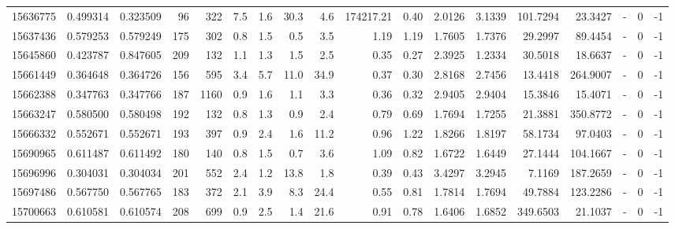 \begin{tabular}{rrrrrrrrrrrrrrrlrr}
  15636775 & 0.499314 &   0.323509 &   96 &  322 &      7.5 &      1.6 &    30.3 &      4.6 &  174217.21 &        0.40 &  2.0126 &  3.1339 &  101.7294 &   23.3427 &             - &        0 &         -1 \\
  15637436 & 0.579253 &   0.579249 &  175 &  302 &      0.8 &      1.5 &     0.5 &      3.5 &       1.19 &        1.19 &  1.7605 &  1.7376 &   29.2997 &   89.4454 &             - &        0 &         -1 \\
  15645860 & 0.423787 &   0.847605 &  209 &  132 &      1.1 &      1.3 &     1.5 &      2.5 &       0.35 &        0.27 &  2.3925 &  1.2334 &   30.5018 &   18.6637 &             - &        0 &         -1 \\
  15661449 & 0.364648 &   0.364726 &  156 &  595 &      3.4 &      5.7 &    11.0 &     34.9 &       0.37 &        0.30 &  2.8168 &  2.7456 &   13.4418 &  264.9007 &             - &        0 &         -1 \\
  15662388 & 0.347763 &   0.347766 &  187 & 1160 &      0.9 &      1.6 &     1.1 &      3.3 &       0.36 &        0.32 &  2.9405 &  2.9404 &   15.3846 &   15.4071 &             - &        0 &         -1 \\
  15663247 & 0.580500 &   0.580498 &  192 &  132 &      0.8 &      1.3 &     0.9 &      2.4 &       0.79 &        0.69 &  1.7694 &  1.7255 &   21.3881 &  350.8772 &             - &        0 &         -1 \\
  15666332 & 0.552671 &   0.552671 &  193 &  397 &      0.9 &      2.4 &     1.6 &     11.2 &       0.96 &        1.22 &  1.8266 &  1.8197 &   58.1734 &   97.0403 &             - &        0 &         -1 \\
  15690965 & 0.611487 &   0.611492 &  180 &  140 &      0.8 &      1.5 &     0.7 &      3.6 &       1.09 &        0.82 &  1.6722 &  1.6449 &   27.1444 &  104.1667 &             - &        0 &         -1 \\
  15696996 & 0.304031 &   0.304034 &  201 &  552 &      2.4 &      1.2 &    13.8 &      1.8 &       0.39 &        0.43 &  3.4297 &  3.2945 &    7.1169 &  187.2659 &             - &        0 &         -1 \\
  15697486 & 0.567750 &   0.567765 &  183 &  372 &      2.1 &      3.9 &     8.3 &     24.4 &       0.55 &        0.81 &  1.7814 &  1.7694 &   49.7884 &  123.2286 &             - &        0 &         -1 \\
  15700663 & 0.610581 &   0.610574 &  208 &  699 &      0.9 &      2.5 &     1.4 &     21.6 &       0.91 &        0.78 &  1.6406 &  1.6852 &  349.6503 &   21.1037 &             - &        0 &         -1 \\

\end{tabular}
